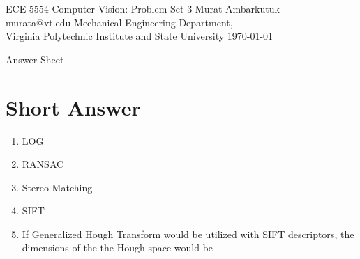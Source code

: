 \documentclass{article}
\begin{document}
\label{Cover}
	\begin{center}
	\large{ECE-5554 Computer Vision: Problem Set 3} 
	\vfill
	Murat Ambarkutuk \\ murata@vt.edu
	\vfill
	Mechanical Engineering Department,\\ Virginia Polytechnic Institute and State University
	\vfill
	\today
	\end{center}
\pagebreak 
\large{Answer Sheet}
\label{Short Answer}
\section{Short Answer}
\begin{enumerate}
	\item LOG
	\item RANSAC 
	\item Stereo Matching
	\item SIFT 
	\item If Generalized Hough Transform would be utilized with SIFT descriptors,
	the dimensions of the the Hough space would be 
\end{enumerate}

\label{Programming Problem (Bag of Words)}
\end{document}
